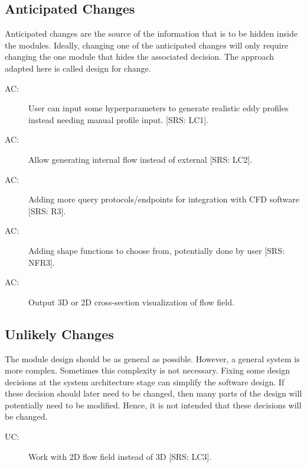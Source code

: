 \documentclass[12pt, titlepage]{article}
\newcounter{acnum}
\newcommand{\actheacnum}{AC\theacnum}
\newcounter{ucnum}
\newcommand{\uctheucnum}{UC\theucnum}
\begin{document}
\subsection{Anticipated Changes} \label{SecAchange}

Anticipated changes are the source of the information that is to be hidden
inside the modules. Ideally, changing one of the anticipated changes will only
require changing the one module that hides the associated decision. The approach
adapted here is called design for
change.

\begin{description}
\item[ \actheacnum \label{acRealEddy}:] User can input some hyperparameters to generate realistic eddy profiles instead needing manual profile input. [SRS: LC1].
\item[ \actheacnum \label{acInternal}:] Allow generating internal flow instead of external [SRS: LC2].
\item[ \actheacnum \label{acQuery}:] Adding more query protocols/endpoints for integration with CFD software [SRS: R3].
\item[ \actheacnum \label{acShape}:] Adding shape functions to choose from, potentially done by user [SRS: NFR3].
\item[ \actheacnum \label{acVisual}:] Output 3D or 2D cross-section visualization of flow field.
\end{description}

\subsection{Unlikely Changes} \label{SecUchange}

The module design should be as general as possible. However, a general system is
more complex. Sometimes this complexity is not necessary. Fixing some design
decisions at the system architecture stage can simplify the software design. If
these decision should later need to be changed, then many parts of the design
will potentially need to be modified. Hence, it is not intended that these
decisions will be changed.

\begin{description}
\item[ \uctheucnum \label{uc2D}:] Work with 2D flow field instead of 3D [SRS: LC3].
\end{description}
\end{document}
